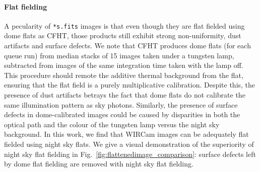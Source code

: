 \documentclass[iop]{emulateapj}
\newcommand{\Fig}[1]{Fig.~\ref{fig:#1}}  %
\begin{document}
\paragraph{Flat fielding} A pecularity of \texttt{*s.fits} images is that even though they are flat fielded using dome flats as CFHT, those products still exhibit strong non-uniformity, dust artifacts and surface defects.
%
%
We note that CFHT produces dome flats (for each queue run) from median stacks of 15 images taken under a tungsten lamp, subtracted from images of the same integration time taken with the lamp off.
This procedure should remote the additive thermal background from the flat, ensuring that the flat field is a purely multiplicative calibration.
Despite this, the presence of dust artifacts betrays the fact that dome flats do not calibrate the same illumination pattern as sky photons.
Similarly, the presence of surface defects in dome-calibrated images could be caused by disparities in both the optical path and the colour of the tungsten lamp versus the night sky background.
In this work, we find that WIRCam images can be adequately flat fielded using night sky flats.
We give a visual demonstration of the superiority of night sky flat fielding in \Fig{flattenedimage_comparison}: surface defects left by dome flat fielding are removed with night sky flat fielding.
\end{document}
